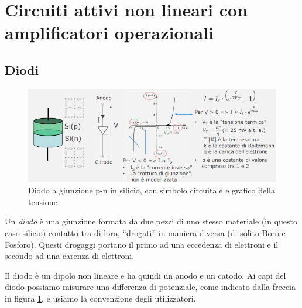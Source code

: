 \documentclass{article}
\begin{document}
\clearpage



















\section{Circuiti attivi non lineari con amplificatori operazionali}

\subsection{Diodi}

\begin{figure}[h]
  \centering
  \includegraphics[scale=0.55]{IM_diodo_p_n}
  \caption{Diodo a giunzione p-n in silicio, con simbolo circuitale e grafico della tensione}
  \label{Schema_diodo_p_n}
\end{figure}

Un \textit{diodo} è una giunzione formata da due pezzi di uno stesso materiale (in questo caso silicio) contatto tra di loro, ``drogati'' in maniera diversa (di solito Boro e Fosforo). Questi drogaggi portano il primo ad una eccedenza di elettroni e il secondo ad una carenza di elettroni.

\vspace{3mm}

Il diodo è un dipolo non lineare e ha quindi un anodo e un catodo. Ai capi del diodo possiamo misurare una differenza di potenziale, come indicato dalla freccia in figura \ref{Schema_diodo_p_n}, e usiamo la convenzione degli utilizzatori. 

\vspace{3mm}
\end{document}
